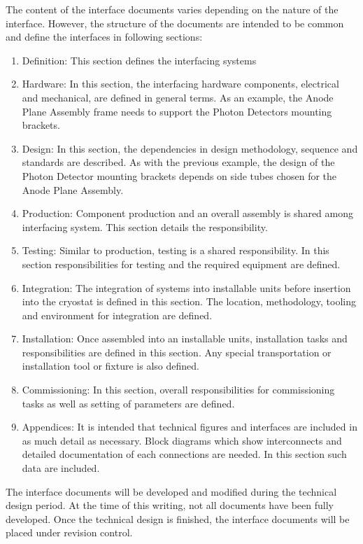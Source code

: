The content of the interface documents varies depending on the nature
of the interface. However, the structure of the documents are intended
to be common and define the interfaces in following sections:
\begin{enumerate}
 \item Definition: This section defines the interfacing systems
 \item Hardware: In this section, the interfacing hardware components,
   electrical and mechanical, are defined in general terms. As an
   example, the Anode Plane Assembly frame needs to support the Photon
   Detectors mounting brackets.
 \item Design: In this section, the dependencies in design
   methodology, sequence and standards are described. As with the
   previous example, the design of the Photon Detector mounting
   brackets depends on side tubes chosen for the Anode Plane Assembly.
 \item Production: Component production and an overall assembly is
   shared among interfacing system. This section details the
   responsibility.
 \item Testing: Similar to production, testing is a shared
   responsibility. In this section responsibilities for testing and
   the required equipment are defined.
 \item Integration: The integration of systems into installable units
   before insertion into the cryostat is defined in this section. The
   location, methodology, tooling and environment for integration are
   defined.
 \item Installation: Once assembled into an installable units,
   installation tasks and responsibilities are defined in this
   section. Any special transportation or installation tool or fixture
   is also defined.
 \item Commissioning: In this section, overall responsibilities for
   commissioning tasks as well as setting of parameters are defined.
 \item Appendices: It is intended that technical figures and
   interfaces are included in as much detail as necessary. Block
   diagrams which show interconnects and detailed documentation of
   each connections are needed. In this section such data are
   included.
\end{enumerate}


The interface documents will be developed and modified during the
technical design period. At the time of this writing, not all
documents have been fully developed. Once the technical design is
finished, the interface documents will be placed under revision
control.
  
